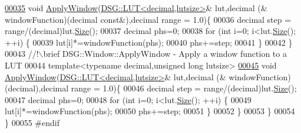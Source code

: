 \begin{DoxyCode}
\hypertarget{_window_8h_source_l00035}{}\hyperlink{namespace_d_s_g_1_1_window_ab3ab521b2e0d85dc752ccc42e642b203}{00035}         \textcolor{keywordtype}{void} \hyperlink{namespace_d_s_g_1_1_window_ab3ab521b2e0d85dc752ccc42e642b203}{ApplyWindow}(\hyperlink{class_d_s_g_1_1_l_u_t}{DSG::LUT<decimal,lutsize>}& lut,decimal (&
      windowFunction)(decimal \textcolor{keyword}{const}&),decimal range = 1.0)\{
00036             decimal step = range/(decimal)lut.\hyperlink{class_d_s_g_1_1_l_u_t_a2d1a2112f9e960c7b70882a19d670ff9}{Size}();
00037             decimal phs=0;
00038             \textcolor{keywordflow}{for} (\textcolor{keywordtype}{int} i=0; i<lut.\hyperlink{class_d_s_g_1_1_l_u_t_a2d1a2112f9e960c7b70882a19d670ff9}{Size}(); ++i) \{
00039                 lut[i]*=windowFunction(phs);
00040                 phs+=step;
00041             \}
00042         \}\textcolor{comment}{}
00043 \textcolor{comment}{        //!\(\backslash\)brief DSG::Window::ApplyWindow - Apply a window function to a LUT}
00044 \textcolor{comment}{}        \textcolor{keyword}{template}<\textcolor{keyword}{typename} decimal,\textcolor{keywordtype}{unsigned} \textcolor{keywordtype}{long} lutsize>
\hypertarget{_window_8h_source_l00045}{}\hyperlink{namespace_d_s_g_1_1_window_a5e559a3fa00e81c4210043fea59d8dae}{00045}         \textcolor{keywordtype}{void} \hyperlink{namespace_d_s_g_1_1_window_ab3ab521b2e0d85dc752ccc42e642b203}{ApplyWindow}(\hyperlink{class_d_s_g_1_1_l_u_t}{DSG::LUT<decimal,lutsize>}& lut,decimal (&
      windowFunction)(decimal),decimal range = 1.0)\{
00046             decimal step = range/(decimal)lut.\hyperlink{class_d_s_g_1_1_l_u_t_a2d1a2112f9e960c7b70882a19d670ff9}{Size}();
00047             decimal phs=0;
00048             \textcolor{keywordflow}{for} (\textcolor{keywordtype}{int} i=0; i<lut.\hyperlink{class_d_s_g_1_1_l_u_t_a2d1a2112f9e960c7b70882a19d670ff9}{Size}(); ++i) \{
00049                 lut[i]*=windowFunction(phs);
00050                 phs+=step;
00051             \}
00052         \}
00053     \}
00054 \}
00055 \textcolor{preprocessor}{#endif}
\end{DoxyCode}
